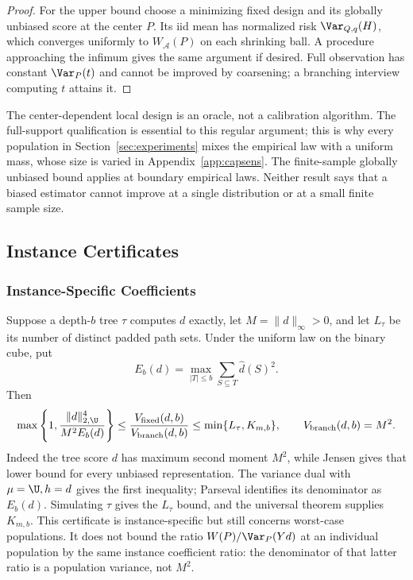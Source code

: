 \begin{proof}
For the upper bound choose a minimizing fixed design and its globally
unbiased score at the center $P$. Its iid mean has normalized risk
$\Var_{Q,q}(H)$, which converges uniformly to $W_{\mathcal A}(P)$ on each
shrinking ball. A procedure approaching the infimum gives the same argument
if desired. Full observation has constant $\Var_P(t)$ and cannot be improved
by coarsening; a branching interview computing $t$ attains it.
\end{proof}

The center-dependent local design is an oracle, not a calibration algorithm.
The full-support qualification is essential to this regular argument; this is
why every population in Section~\ref{sec:experiments} mixes the empirical law
with a uniform mass, whose size is varied in Appendix~\ref{app:capsens}.
The finite-sample globally unbiased bound applies at
boundary empirical laws. Neither result says that a biased estimator cannot
improve at a single distribution or at a small finite sample size.

\subsection{Instance Certificates}\label{app:instances}
\subsubsection{Instance-Specific Coefficients}
Suppose a depth-$b$ tree $\tau$ computes $d$ exactly, let $M=\|d\|_\infty>0$, and let $L_\tau$ be its number of distinct padded path sets. Under the uniform law on the binary cube, put
\[
 E_b(d)=\max_{|T|\le b}\sum_{S\subseteq T}\widehat d(S)^2.
\]
Then
\begin{equation}
 \max\left\{1,\frac{\|d\|_{2,\U}^4}{M^2 E_b(d)}\right\}
 \le \frac{V_{\rm fixed}(d,b)}{V_{\rm branch}(d,b)}
 \le \min\{L_\tau,K_{m,b}\},\qquad V_{\rm branch}(d,b)=M^2.
 \label{eq:instanceinterval}
\end{equation}
Indeed the tree score $d$ has maximum second moment $M^2$, while Jensen gives that lower bound for every unbiased representation. The variance dual with $\mu=\U,h=d$ gives the first inequality; Parseval identifies its denominator as $E_b(d)$. Simulating $\tau$ gives the $L_\tau$ bound, and the universal theorem supplies $K_{m,b}$. This certificate is instance-specific but still concerns worst-case populations. It does not bound the ratio $W(P)/\Var_P(Yd)$ at an individual population by the same instance coefficient ratio: the denominator of that latter ratio is a population variance, not $M^2$.

